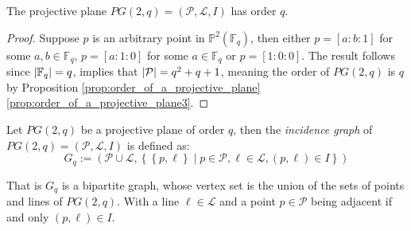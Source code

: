 \begin{corollary}\label{cor:number_of_points_and_lines_in_proj_plane}
	The projective plane $PG(2, q) = (\mathcal{P}, \mathcal{L}, I)$ has order $q$.
\end{corollary}
\begin{proof}
	Suppose $p$ is an arbitrary point in $\mathbb{P}^2(\mathbb{F}_q)$, then either $p = [a: b : 1]$ for some $a, b \in \mathbb{F}_q$, $p = [a: 1: 0]$ for some $a \in \mathbb{F}_{q}$ or $p = [1: 0: 0]$. The result follows since $\left\lvert\mathbb{F}_q\right\rvert = q$, implies that $\left\lvert\mathcal{P}\right\rvert = q^2 + q + 1$, meaning the order of $PG(2, q)$ is $q$ by Proposition \ref{prop:order_of_a_projective_plane}\ref{prop:order_of_a_projective_plane3}.
\end{proof}
\newpage
\begin{definition}
	Let $PG(2, q)$ be a projective plane of order $q$, then the \textit{incidence graph} of $PG(2, q) = (\mathcal{P}, \mathcal{L}, I)$ is defined as:
	\begin{equation*}
		G_q := (\mathcal{P} \cup \mathcal{L}, \left\{\left\{p, \ell\right\} \middle| p \in \mathcal{P}, \ell \in \mathcal{L}, (p, \ell) \in I\right\})
	\end{equation*}
\end{definition}
That is $G_q$ is a bipartite graph, whose vertex set is the union of the sets of points and lines of $PG(2, q)$. With a line $\ell \in \mathcal{L}$ and a point $p \in \mathcal{P}$ being adjacent if and only $(p, \ell) \in I$.

